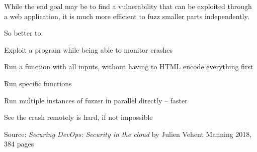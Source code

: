 \documentclass[Screen16to9,17pt]{foils}
\begin{document}
While the end goal may be to find a vulnerability that can be exploited through a web application, it is much more efficient to fuzz smaller parts independently.

So better to:
\begin{list2}
\item Exploit a program while being able to monitor crashes
\item Run a function with all inputs, without having to HTML encode everything first
\item Run specific functions
\item Run multiple instances of fuzzer in parallel directly -- faster
\end{list2}

See the crash remotely is hard, if not impossible



Source:
\emph{Securing DevOps: Security in the cloud} by Julien Vehent
Manning 2018, 384 pages

\begin{quote}

\end{quote}

\begin{list2}
    \item\end{list2}


\slidenext{}
\end{document}
